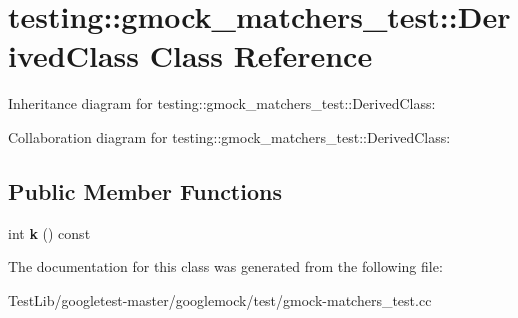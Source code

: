 \hypertarget{classtesting_1_1gmock__matchers__test_1_1DerivedClass}{}\section{testing\+:\+:gmock\+\_\+matchers\+\_\+test\+:\+:Derived\+Class Class Reference}
\label{classtesting_1_1gmock__matchers__test_1_1DerivedClass}


Inheritance diagram for testing\+:\+:gmock\+\_\+matchers\+\_\+test\+:\+:Derived\+Class\+:


Collaboration diagram for testing\+:\+:gmock\+\_\+matchers\+\_\+test\+:\+:Derived\+Class\+:
\subsection*{Public Member Functions}
\begin{DoxyCompactItemize}
\item 
\mbox{\label{classtesting_1_1gmock__matchers__test_1_1DerivedClass_a6f8638915c84cb14365e337d99857847}} 
int {\bfseries k} () const
\end{DoxyCompactItemize}


The documentation for this class was generated from the following file\+:\begin{DoxyCompactItemize}
\item 
Test\+Lib/googletest-\/master/googlemock/test/gmock-\/matchers\+\_\+test.\+cc\end{DoxyCompactItemize}
